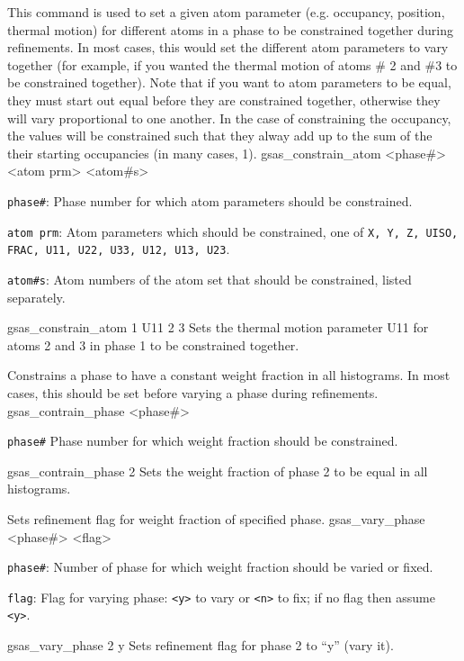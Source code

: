 {
This command is used to set a given atom parameter (e.g. occupancy, position, thermal motion) for different atoms in a phase to be constrained together during refinements.  In most cases, this would set the different atom parameters to vary together (for example, if you wanted the thermal motion of atoms \# 2 and \#3 to be constrained together).  Note that if you want to atom parameters to be equal, they must start out equal before they are constrained together, otherwise they will vary proportional to one another.  In the case of constraining the occupancy, the values will be constrained such that they alway add up to the sum of the their starting occupancies (in many cases, 1). 
 }{
gsas\_constrain\_atom <phase\#> <atom prm> <atom\#s>
 }{
 \item \texttt{phase\#}:  Phase number for which atom parameters should be constrained. 
\item \texttt{atom prm}: Atom parameters which should be constrained, one of \texttt{X, Y, Z, UISO, FRAC, U11, U22, U33, U12, U13, U23}.
\item \texttt{atom\#s}:  Atom numbers of the atom set that should be constrained, listed separately.
 }{
gsas\_constrain\_atom 1 U11 2 3 
 }{
Sets the thermal motion parameter U11 for atoms 2 and 3 in phase 1 to be constrained together.
 }

{
Constrains a phase to have a constant weight fraction in all histograms.  In most cases, this should be set before varying a phase during refinements. 
 }{
gsas\_contrain\_phase <phase\#>
 }{
 \item \texttt{phase\#}  Phase number for which weight fraction should be constrained.
 }{
gsas\_contrain\_phase 2
 }{
Sets the weight fraction of phase 2 to be equal in all histograms. 
 }

{
Sets refinement flag for weight fraction of specified phase.  
}{
gsas\_vary\_phase <phase\#> <flag>
}{
\item \texttt{phase\#}:  Number of phase for which weight fraction should be varied or fixed. 
\item \texttt{flag}: Flag for varying phase: \texttt{<y>} to vary or \texttt{<n>} to fix; if no flag then assume \texttt{<y>}.  
}{
gsas\_vary\_phase 2 y
}{
Sets refinement flag for phase 2 to ``y'' (vary it).
}

